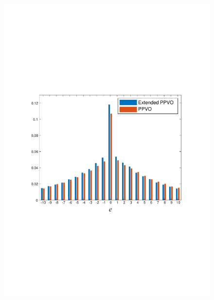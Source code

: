 \documentclass[review,3p,10pt,sort&compress]{elsarticle}
\begin{document}
\begin{figure}
{\begin{minipage}[t]{0.4\linewidth}
    \includegraphics[width=1\textwidth]{figures/Comparison/4Pixels/baboon1.pdf}
    \end{minipage}
}



\end{figure}
\end{document}
